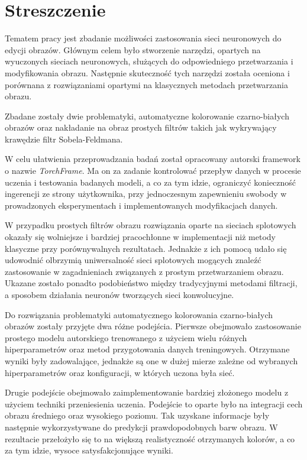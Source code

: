 \section*{Streszczenie}

  Tematem pracy jest zbadanie możliwości zastosowania sieci neuronowych do
  edycji obrazów. Głównym celem było stworzenie narzędzi, opartych na wyuczonych
  sieciach neuronowych, służących do odpowiedniego przetwarzania i
  modyfikowania obrazu. Następnie skuteczność tych narzędzi została oceniona i
  porównana z rozwiązaniami opartymi na klasycznych metodach przetwarzania obrazu.

  Zbadane zostały dwie problematyki, automatyczne kolorowanie czarno-białych obrazów
  oraz nakładanie na obraz prostych filtrów takich jak wykrywający
  krawędzie filtr Sobela-Feldmana.

  W celu ułatwienia przeprowadzania badań został opracowany autorski framework
  o nazwie \textit{TorchFrame}. Ma on za zadanie kontrolować
  przepływ danych w procesie uczenia i testowania badanych modeli, a co za tym
  idzie, ograniczyć konieczność ingerencji ze strony użytkownika, przy jednoczesnym
  zapewnieniu swobody w prowadzonych eksperymentach i implementowanych modyfikacjach danych.

  W przypadku prostych filtrów obrazu rozwiązania
  oparte na sieciach splotowych okazały się wolniejsze i bardziej pracochłonne w
  implementacji niż metody klasyczne przy porównywalnych rezultatach. Jednakże
  z ich pomocą udało się udowodnić olbrzymią uniwersalność sieci splotowych
  mogących znaleźć zastosowanie w zagadnieniach związanych z prostym
  przetwarzaniem obrazu. Ukazane zostało ponadto podobieństwo między tradycyjnymi
  metodami filtracji, a sposobem działania neuronów tworzących sieci konwolucyjne.

  Do rozwiązania problematyki automatycznego kolorowania czarno-białych
  obrazów zostały przyjęte dwa różne podejścia. Pierwsze obejmowało
  zastosowanie prostego modelu autorskiego trenowanego z użyciem wielu różnych
  hiperparametrów oraz metod przygotowania danych treningowych.
  Otrzymane wyniki były zadowalające,
  jednakże są one w dużej mierze zależne od wybranych hiperparametrów oraz
  konfiguracji, w których uczona była sieć.

  Drugie podejście obejmowało zaimplementowanie bardziej złożonego modelu
  z użyciem techniki przeniesienia uczenia. Podejście to oparte
  było na integracji cech obrazu średniego oraz wysokiego poziomu.
  Tak uzyskane informacje były następnie wykorzystywane do predykcji
  prawdopodobnych barw obrazu.
  W rezultacie przełożyło się to na większą realistyczność otrzymanych kolorów,
  a co za tym idzie, wysoce satysfakcjonujące wyniki.

